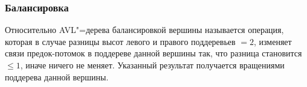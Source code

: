 \begin{frame}
    \frametitle{Балансировка}

    Относительно AVL"=дерева балансировкой вершины называется операция,
    которая в случае разницы высот левого и правого поддеревьев $= 2$,
    изменяет связи предок-потомок в поддереве данной вершины так,
    что разница становится $ \leqslant 1$, иначе ничего не меняет.
    Указанный результат получается вращениями поддерева данной вершины.
    
\end{frame}